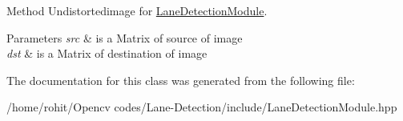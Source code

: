 Method Undistortedimage for \hyperlink{classLaneDetectionModule}{Lane\+Detection\+Module}. 


\begin{DoxyParams}{Parameters}
{\em src} & is a Matrix of source of image \\
\hline
{\em dst} & is a Matrix of destination of image \\
\hline
\end{DoxyParams}


The documentation for this class was generated from the following file\+:\begin{DoxyCompactItemize}
\item 
/home/rohit/\+Opencv codes/\+Lane-\/\+Detection/include/Lane\+Detection\+Module.\+hpp\end{DoxyCompactItemize}
